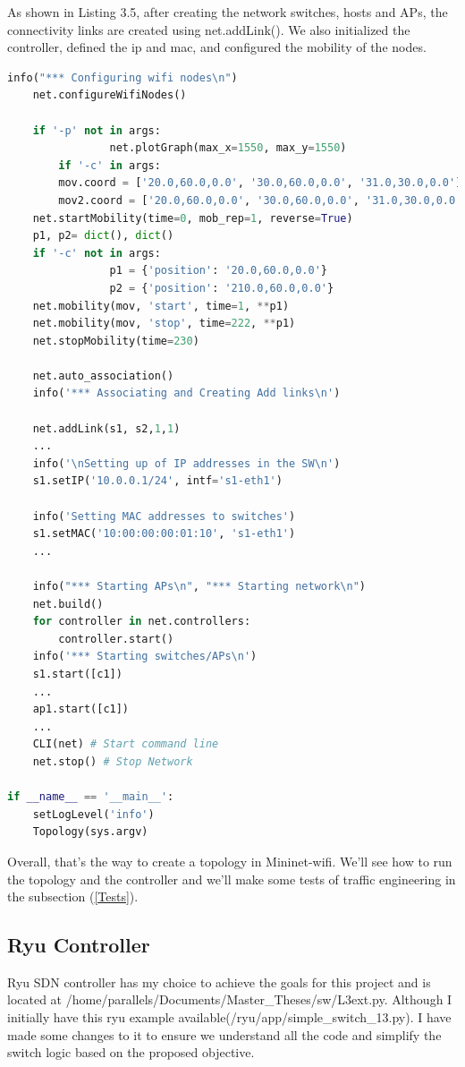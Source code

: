 \documentclass[
  oneside,
  11pt, a4paper,
  footinclude=true,
  headinclude=true,
  cleardoublepage=empty
]{scrbook}
\begin{document}
As shown in   Listing 3.5, after creating the network switches, hosts and APs, the connectivity links are created using net.addLink(). We also initialized the controller, defined the ip and mac, and configured the mobility of the nodes.
\begin{lstlisting}[language=Python, caption= Parameters to complete the topology] 
    info("*** Configuring wifi nodes\n")
    net.configureWifiNodes()

    if '-p' not in args:
                net.plotGraph(max_x=1550, max_y=1550)
        if '-c' in args:
        mov.coord = ['20.0,60.0,0.0', '30.0,60.0,0.0', '31.0,30.0,0.0']
        mov2.coord = ['20.0,60.0,0.0', '30.0,60.0,0.0', '31.0,30.0,0.0']
    net.startMobility(time=0, mob_rep=1, reverse=True)
    p1, p2= dict(), dict()
    if '-c' not in args:
                p1 = {'position': '20.0,60.0,0.0'}
                p2 = {'position': '210.0,60.0,0.0'}       
    net.mobility(mov, 'start', time=1, **p1)
    net.mobility(mov, 'stop', time=222, **p1)
    net.stopMobility(time=230)
    
    net.auto_association()
    info('*** Associating and Creating Add links\n')

    net.addLink(s1, s2,1,1)
    ...
    info('\nSetting up of IP addresses in the SW\n')
    s1.setIP('10.0.0.1/24', intf='s1-eth1')
    
    info('Setting MAC addresses to switches')
    s1.setMAC('10:00:00:00:01:10', 's1-eth1')
    ...
    
    info("*** Starting APs\n", "*** Starting network\n")
    net.build()
    for controller in net.controllers:
        controller.start()
    info('*** Starting switches/APs\n')
    s1.start([c1])
    ...
    ap1.start([c1])
    ...
    CLI(net) # Start command line
    net.stop() # Stop Network

if __name__ == '__main__':
    setLogLevel('info')
    Topology(sys.argv)

\end{lstlisting}

Overall, that's the way to create a topology in Mininet-wifi. We'll see how to run the topology and the controller  and we'll make some tests of traffic engineering in the subsection (\ref{Tests}).

\subsection {Ryu Controller}

Ryu SDN controller has my choice to achieve the goals for this project and is located at
/home/parallels/Documents/Master\_Theses/sw/L3ext.py.  Although I initially have this ryu example available(/ryu/app/simple\_switch\_13.py). I have made some changes to it to ensure we understand all the code and simplify the switch logic based on the proposed objective.
\end{document}
